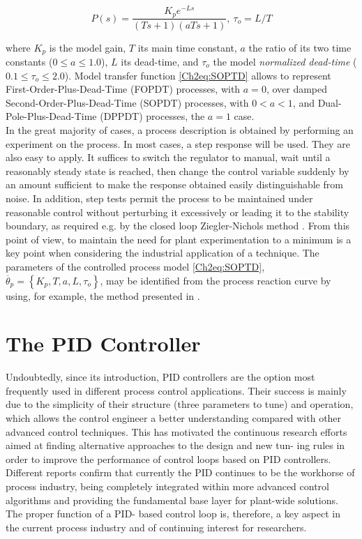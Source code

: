 \begin{equation}
    P(s) = \frac{K_p e^{-Ls}}{(Ts+1)(aTs+1)}, \ \tau_o = L/T 
    \label{Ch2eq:SOPTD}
\end{equation}

\noindent where $K_p$ is the model gain, $T$ its main time constant, $a$ the ratio of its two time constants ($0 \leq a \leq 1.0$), $L$ its dead-time, and $\tau_o$ the model \emph{normalized dead-time} ($0.1 \leq \tau_o \leq 2.0$). Model transfer function \eqref{Ch2eq:SOPTD} allows to represent First-Order-Plus-Dead-Time (FOPDT) processes, with $a=0$, over damped Second-Order-Plus-Dead-Time (SOPDT) processes, with $0 < a < 1$, and Dual-Pole-Plus-Dead-Time (DPPDT) processes, the $a=1$ case.\\

In the great majority of cases, a process description is obtained by performing an experiment on the process. In most cases, a step response will be used. They are also easy to apply. It suffices to switch the regulator to manual, wait until a reasonably steady state is reached, then change the control variable suddenly by an amount sufficient to make the response obtained easily distinguishable from noise. In addition, step tests permit the process to be maintained under reasonable control without perturbing it excessively or leading it to the stability boundary, as required e.g. by the closed loop Ziegler-Nichols method \citep{astromhagglund2006}. From this point of view, to maintain the need for plant experimentation to a minimum is a key point when considering the industrial application of a technique. The parameters of the controlled process model \eqref{Ch2eq:SOPTD}, $\overline{\theta}_p = \left\{K_p, T, a, L, \tau_o \right\}$, may be identified from the process reaction curve by using, for example, the method presented in \citep{alfaro2006-1}. 



\section{The PID Controller}
\label{sec:3}
Undoubtedly, since its introduction, PID controllers are the option most frequently used in different process control applications. Their success is mainly due to the simplicity of their structure (three parameters to tune) and operation, which allows the control engineer a better understanding compared with other advanced control techniques. This has motivated the continuous research efforts aimed at finding alternative approaches to the design and new tun- ing rules in order to improve the performance of control loops based on PID controllers. Different reports confirm that currently the PID continues to be the workhorse of process industry, being completely integrated within more advanced control algorithms and providing the fundamental base layer for plant-wide solutions. The proper function of a PID- based control loop is, therefore, a key aspect in the current process industry and of continuing interest for researchers.\\

